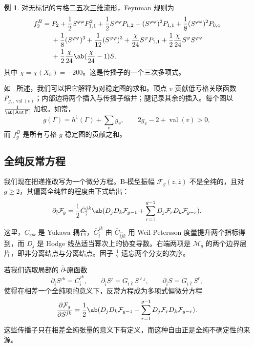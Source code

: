 \documentclass{amsart}
\theoremstyle{definition}
\newtheorem{exm}[thm]{例}
\theoremstyle{remark}
\theoremstyle{plain}
\theoremstyle{definition}
\theoremstyle{remark}
\newcommand{\Mbar}{\overline{\mathcal{M}}}
\newcommand{\mc}[1]{\mathcal{#1}}
\newcommand{\on}[1]{\operatorname{#1}}
\newcommand{\1}{\mathbf{1}}
\newcommand{\2}{\mathbf{2}}
\newcommand{\3}{\mathbf{3}}
\DeclareMathOperator{\Aut}{Aut}
\begin{document}
\begin{exm}
    对无标记的亏格二五次三维流形，Feynman 规则为
    \begin{align*}
        f_2^B ={}& P_2 + \frac{1}{2}S^{\varphi\varphi}P_{1,1}^2 + \frac{1}{2}S^{\varphi\varphi}P_{1,2} + (S^{\varphi\varphi})^2 P_{1,1} + \frac{1}{8}(S^{\varphi\varphi})^2 P_{0,4} \\
        &+ \frac{1}{8}(S^{\varphi\varphi})^3 + \frac{1}{12}(S^{\varphi\varphi})^3 + \frac{\chi}{24}S^{\varphi}P_{1,1} + \frac{1}{2}\frac{\chi}{24}S^{\varphi}S^{\varphi\varphi} \\
        &+ \frac{1}{2}\frac{\chi}{24}\ab(\frac{\chi}{24}-1)S,
    \end{align*}
    其中 \(\chi = \chi(X_5) = -200\)。这是传播子的一个三次多项式。
\end{exm}

如~ 所述，我们可以把它解释为对稳定图的求和。顶点 \(v\) 贡献低亏格关联函数 \(P_{g_v, \on{val}(v)}\)；内部边将两个插入与传播子缩并；腿记录其余的插入。每个图以 \(\frac{1}{\ab|\Aut \Gamma|}\) 加权。如常，
\[ g(\Gamma) = h^1(\Gamma) + \sum_v g_v, \qquad 2g_v - 2 + \on{val}(v) > 0, \]
而 \(f_g^B\) 是所有亏格 \(g\) 稳定图的贡献之和。

\subsection{全纯反常方程}%
\label{sub:The holomorphic anomaly equation}

我们现在把递推改写为一个微分方程。B-模型振幅 \(\mc{F}_g(z,\bar{z})\) 不是全纯的，且对 \(g \geq 2\)，其偏离全纯性的程度由下式给出：
\[ \partial_{\bar{i}} \mc{F}_g = \frac{1}{2}\bar{C}_{\bar{i}}^{jk}\ab( D_j D_k \mc{F}_{g-1} + \sum_{r=1}^{g-1} D_j \mc{F}_r D_k \mc{F}_{g-r} ). \]
这里，\(C_{ijk}\) 是 Yukawa 耦合，\(\bar{C}_{\bar{i}}^{jk}\) 由 \(\bar{C}_{\bar{i}\bar{j}\bar{k}}\) 用 Weil-Petersson 度量提升两个指标得到，而 \(D_j\) 是 Hodge 线丛适当幂次上的协变导数。右端两项是 \(\Mbar_g\) 的两个边界层片，即非分离结点与分离结点。因子 \(\frac{1}{2}\) 遗忘两个分支的次序。

若我们选取局部的 \(\bar{\partial}\)-原函数
\[ \partial_{\bar{i}}S^{jk} = \bar{C}_{\bar{i}}^{jk}, \qquad \partial_{\bar{i}}S^j = G_{i\bar{\ell}}S^{\ell j}, \qquad \partial_{\bar{i}}S = G_{i\bar{\ell}}S^{\ell}, \]
使得在相差一个全纯项的意义下，反常方程成为多项式偏微分方程
\[ \pdv{\mc{F}_g}{S^{jk}} = \frac{1}{2}\ab( D_jD_k \mc{F}_{g-1} + \sum_{r=1}^{g-1} D_j \mc{F}_r D_k \mc{F}_{g-r} ). \]
这些传播子只在相差全纯张量的意义下有定义，而这种自由正是全纯不确定性的来源。
\end{document}

